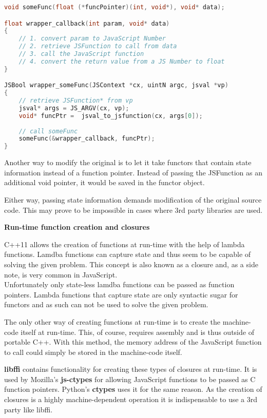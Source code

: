 \begin{lstlisting}[language=C++, caption=Wrapper code for handling methods that take function pointers \#2]
void someFunc(float (*funcPointer)(int, void*), void* data);

float wrapper_callback(int param, void* data)
{
	// 1. convert param to JavaScript Number
	// 2. retrieve JSFunction to call from data
	// 3. call the JavaScript function
	// 4. convert the return value from a JS Number to float
}

JSBool wrapper_someFunc(JSContext *cx, uintN argc, jsval *vp)
{
	// retrieve JSFunction* from vp
	jsval* args = JS_ARGV(cx, vp);
	void* funcPtr =  jsval_to_jsfunction(cx, args[0]);
	
	// call someFunc
	someFunc(&wrapper_callback, funcPtr);
}
\end{lstlisting}

Another way to modify the original  is to let it take functors that contain state information instead of a function pointer. Instead of passing the JSFunction as an additional void pointer, it would be saved in the functor object.

Either way, passing state information demands modification of the original source code. This may prove to be impossible in cases where 3rd party libraries are used.

\textbf{Run-time function creation and closures}

C++11 allows the creation of functions at run-time with the help of lambda functions. Lamdba functions can capture state and thus seem to be capable of solving the given problem. This concept is also known as a closure and, as a side note, is very common in JavaScript.
\\Unfortunately only state-less lamdba functions can be passed as function pointers. Lambda functions that capture state are only syntactic sugar for functors and as such can not be used to solve the given problem.

The only other way of creating functions at run-time is to create the machine-code itself at run-time. This, of course, requires assembly and is thus outside of portable C++. With this method, the memory address of the JavaScript function to call could simply be stored in the machine-code itself.

\textbf{libffi} contains functionality for creating these types of closures at run-time. It is used by Mozilla's \textbf{js-ctypes} for allowing JavaScript functions to be passed as C function pointers. Python's \textbf{ctypes} uses it for the same reason. As the creation of closures is a highly machine-dependent operation it is indispensable to use a 3rd party like libffi.

